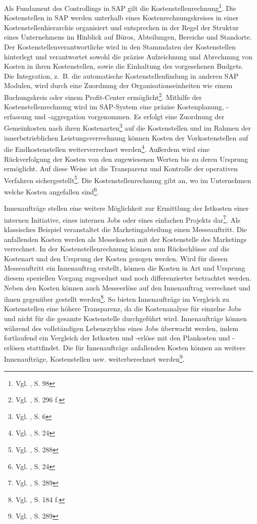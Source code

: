 Als Fundament des Controllings in SAP gilt die Kostenstellenrechnung\footnote{Vgl. \cite{Klein2010}, S. 98}.
Die Kostenstellen in SAP werden unterhalb eines Kostenrechnungskreises in einer Kostenstellenhierarchie organisiert und entsprechen in der Regel der Struktur eines Unternehmens im Hinblick auf Büros, Abteilungen, Bereiche und Standorte. Der Kostenstellenverantwortliche wird in den Stammdaten der Kostenstellen hinterlegt und verantwortet sowohl die präzise Aufzeichnung und Abrechnung von Kosten in ihren Kostenstellen, sowie die Einhaltung des vorgesehenen Budgets. Die Integration, z.~B. die automatische Kostenstellenfindung in anderen SAP Modulen, wird durch eine Zuordnung der Organisationseinheiten wie einem Buchungskreis oder einem Profit-Center ermöglicht\footnote{Vgl. \cite{Patel2009}, S. 296 f.}.
Mithilfe der Kostenstellenrechnung wird im SAP-System eine präzise Kostenplanung, -erfassung und -aggregation vorgenommen. Es erfolgt eine Zuordnung der Gemeinkosten nach ihren Kostenarten\footnote{Vgl. \cite{SAPOMCEL2001}, S. 6} auf die Kostenstellen und im Rahmen der innerbetrieblichen Leistungsverrechnung können Kosten der Vorkostenstellen auf die Endkostenstellen weiterverrechnet werden\footnote{Vgl. \cite{Friedl2008}, S. 24}. Außerdem wird eine Rückverfolgung der Kosten von den zugewiesenen Werten bis zu deren Ursprung ermöglicht. 
Auf diese Weise ist die Transparenz und Kontrolle der operativen Verfahren sichergestellt\footnote{Vgl. \cite{Patel2009}, S. 288}. 
Die Kostenstellenrechnung gibt an, wo im Unternehmen welche Kosten angefallen sind\footnote{Vgl. \cite{Friedl2008}, S. 24}.

Innenaufträge stellen eine weitere Möglichkeit zur Ermittlung der Istkosten einer internen Initiative, eines internen Jobs oder eines einfachen Projekts dar\footnote{Vgl. \cite{Patel2009}, S. 289}. Als klassisches Beispiel veranstaltet die Marketingabteilung einen Messeauftritt. Die anfallenden Kosten werden als Messekosten mit der Kostenstelle des Marketings verrechnet. In der Kostenstellenrechnung können nun Rückschlüsse auf die Kostenart und den Ursprung der Kosten gezogen werden. Wird für diesen Messeauftritt ein Innenauftrag erstellt, können die Kosten in Art und Ursprung diesem speziellen Vorgang zugeordnet und noch differenzierter betrachtet werden. Neben den Kosten können auch Messeerlöse auf den Innenauftrag verrechnet und ihnen gegenüber gestellt werden\footnote{Vgl. \cite{Klein2010}, S. 184 f.}. 
So bieten Innenaufträge im Vergleich zu Kostenstellen eine höhere Transparenz, da die Kostenanalyse für einzelne Jobs und nicht für die gesamte Kostenstelle durchgeführt wird. Innenaufträge können während des vollständigen Lebenszyklus eines Jobs überwacht werden, indem fortlaufend ein Vergleich der Istkosten und -erlöse mit den Plankosten und -erlösen stattfindet. Die für Innenaufträge anfallenden Kosten können an weitere Innenaufträge, Kostenstellen usw. weiterberechnet werden\footnote{Vgl. \cite{Patel2009}, S. 289}.

